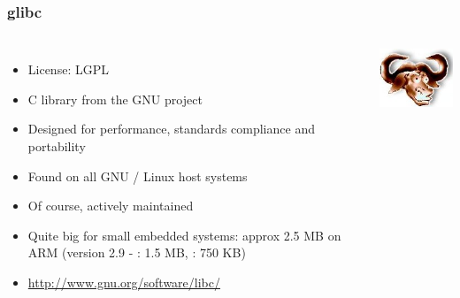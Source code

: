 \begin{frame}
  \frametitle{glibc}
  \begin{columns}
    \begin{itemize}
    \item License: LGPL
    \item C library from the GNU project
    \item Designed for performance, standards compliance and portability
    \item Found on all GNU / Linux host systems
    \item Of course, actively maintained
    \item Quite big for small embedded systems: approx 2.5 MB on ARM
      (version 2.9 - : 1.5 MB, : 750 KB)
    \item \url{http://www.gnu.org/software/libc/}
    \end{itemize}
    \includegraphics[width=\textwidth]{slides/c-libraries/glibc.png}
  \end{columns}
\end{frame}

